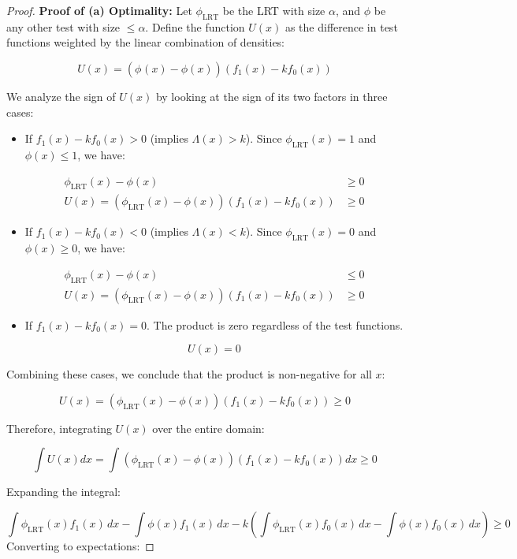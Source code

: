 \documentclass[
  letterpaper,
  DIV=11,
  numbers=noendperiod]{scrreprt}
\renewcommand{\[}{\begin{equation}}
\renewcommand{\]}{\end{equation}}
\theoremstyle{definition}
\theoremstyle{plain}
\theoremstyle{plain}
\theoremstyle{plain}
\theoremstyle{definition}
\theoremstyle{plain}
\theoremstyle{remark}
\begin{document}
\begin{proof}
\textbf{Proof of (a) Optimality:} Let \(\phi_{\text{LRT}}\) be the LRT
with size \(\alpha\), and \(\phi\) be any other test with size
\(\le \alpha\). Define the function \(U(x)\) as the difference in test
functions weighted by the linear combination of densities:

\[
U(x) = (\phi_{}(x) - \phi(x))(f_1(x) - k f_0(x))
\]

We analyze the sign of \(U(x)\) by looking at the sign of its two
factors in three cases:

\begin{itemize}
\item
  If \(f_1(x) - k f_0(x) > 0\) (implies \(\Lambda(x) > k\)). Since
  \(\phi_{\text{LRT}}(x) = 1\) and \(\phi(x) \le 1\), we have:

  \[
    \begin{aligned}
    \phi_{\text{LRT}}(x) - \phi(x) &\ge 0 \\
    U(x) = (\phi_{\text{LRT}}(x) - \phi(x))(f_1(x) - k f_0(x)) &\ge 0
    \end{aligned}
    \]
\item
  If \(f_1(x) - k f_0(x) < 0\) (implies \(\Lambda(x) < k\)). Since
  \(\phi_{\text{LRT}}(x) = 0\) and \(\phi(x) \ge 0\), we have:

  \[
    \begin{aligned}
    \phi_{\text{LRT}}(x) - \phi(x) &\le 0 \\
    U(x) = (\phi_{\text{LRT}}(x) - \phi(x))(f_1(x) - k f_0(x)) &\ge 0
    \end{aligned}
    \]
\item
  If \(f_1(x) - k f_0(x) = 0\). The product is zero regardless of the
  test functions.

  \[
    U(x) = 0
    \]
\end{itemize}

Combining these cases, we conclude that the product is non-negative for
all \(x\):

\[
U(x) = (\phi_{\text{LRT}}(x) - \phi(x))(f_1(x) - k f_0(x)) \ge 0
\]

Therefore, integrating \(U(x)\) over the entire domain:

\[
\int U(x) dx = \int (\phi_{\text{LRT}}(x) - \phi(x))(f_1(x) - k f_0(x)) dx \ge 0
\]

Expanding the integral:

\[
\int \phi_{\text{LRT}}(x) f_1(x) \, dx - \int \phi(x) f_1(x) \, dx - k \left( \int \phi_{\text{LRT}}(x) f_0(x) \, dx - \int \phi(x) f_0(x) \, dx \right) \ge 0
\] Converting to expectations:


\end{proof}
\end{document}
